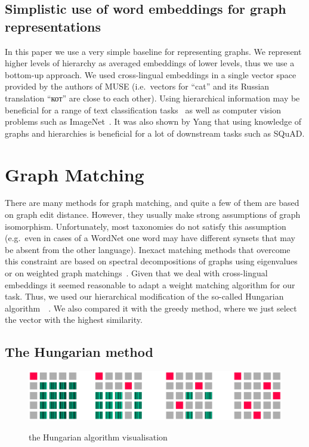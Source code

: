 \documentclass[11pt,a4paper]{article}
\begin{document}
\subsection{Simplistic use of word embeddings for graph representations}
In this paper we use a very simple baseline for representing graphs. We represent higher levels of hierarchy as averaged embeddings of lower levels, thus we use a bottom-up approach. We used cross-lingual embeddings in a single vector space provided by the authors of MUSE (i.e.\ vectors for ``cat'' and its Russian translation \foreignlanguage{russian}{``кот''} are close to each other). Using hierarchical information may be beneficial for a range of text classification tasks~\cite{tax2vec} as well as computer vision problems such as ImageNet~\cite{hedging-bets}. It was also shown by Yang \citeyearpar{glomo} that using knowledge of graphs and hierarchies is beneficial for a lot of downstream tasks such as SQuAD.


\section{Graph Matching}
There are many methods for graph matching, and quite a few of them are based on graph edit distance. However, they usually make strong assumptions of graph isomorphism. Unfortunately, most taxonomies do not satisfy this assumption (e.g.\ even in cases of a WordNet one word may have different synsets that may be absent from the other language). Inexact matching methods that overcome this constraint are based on spectral decompositions of graphs using eigenvalues or on weighted graph matchings~\cite{30years-graphs}. Given that we deal with cross-lingual embeddings it seemed reasonable to adapt a weight matching algorithm for our task. Thus, we used our hierarchical modification of the so-called Hungarian algorithm~\cite[p.~201]{lawler}~\cite[p.~48]{Riesen2010}. We also compared it with the greedy method, where we just select the vector with the highest similarity.
\subsection{The Hungarian method}
\begin{figure}

	\centering
	\small
	\includegraphics[scale=0.3]{hungarian}\\

	\caption{the Hungarian algorithm visualisation}
	\label{hungarian}
\end{figure}
\end{document}
